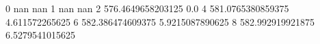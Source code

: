 0 nan nan
1 nan nan
2 576.4649658203125 0.0
4 581.0765380859375 4.611572265625
6 582.386474609375 5.9215087890625
8 582.992919921875 6.5279541015625
